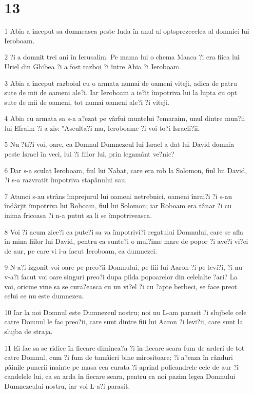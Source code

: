 \chapter{13}

\par 1 Abia a început sa domneasca peste Iuda în anul al optsprezecelea al domniei lui Ieroboam.
\par 2 ?i a domnit trei ani în Ierusalim. Pe mama lui o chema Maaca ?i era fiica lui Uriel din Ghibea ?i a fost razboi ?i între Abia ?i Ieroboam.
\par 3 Abia a început razboiul cu o armata numai de oameni viteji, adica de patru sute de mii de oameni ale?i. Iar Ieroboam a ie?it împotriva lui la lupta cu opt sute de mii de oameni, tot numai oameni ale?i ?i viteji.
\par 4 Abia cu armata sa s-a a?ezat pe vârfui muntelui ?emaraim, unul dintre mun?ii lui Efraim ?i a zis: "Asculta?i-ma, Ieroboame ?i voi to?i Israeli?ii.
\par 5 Nu ?ti?i voi, oare, ca Domnul Dumnezeul lui Israel a dat lui David domnia peste Israel în veci, lui ?i fiilor lui, prin legamânt ve?nic?
\par 6 Dar s-a sculat Ieroboam, fiul lui Nabat, care era rob la Solomon, fiul lui David, ?i s-a razvratit împotriva stapânului sau.
\par 7 Atunci s-au strâns împrejurul lui oameni netrebnici, oameni înrai?i ?i s-au îndârjit împotriva lui Roboam, fiul lui Solomon; iar Roboam era tânar ?i cu inima fricoasa ?i n-a putut sa li se împotriveasca.
\par 8 Voi ?i acum zice?i ca pute?i sa va împotrivi?i regatului Domnului, care se afla în mina fiilor lui David, pentru ca sunte?i o mul?ime mare de popor ?i ave?i vi?ei de aur, pe care vi i-a facut Ieroboam, ca dumnezei.
\par 9 N-a?i izgonit voi oare pe preo?ii Domnului, pe fiii lui Aaron ?i pe levi?i, ?i nu v-a?i facut voi oare singuri preo?i dupa pilda popoarelor din celelalte ?ari? La voi, oricine vine sa se cura?easca cu un vi?el ?i cu ?apte berbeci, se face preot celui ce nu este dumnezeu.
\par 10 Iar la noi Domnul este Dumnezeul nostru; noi nu L-am parasit ?i slujbele cele catre Domnul le fac preo?ii, care sunt dintre fiii lui Aaron ?i levi?ii, care sunt la slujba de straja.
\par 11 Ei fac sa se ridice în fiecare diminea?a ?i în fiecare seara fum de arderi de tot catre Domnul, cum ?i fum de tamâieri bine mirositoare; ?i a?eaza în rânduri pâinile punerii înainte pe masa cea curata ?i aprind policandrele cele de aur ?i candelele lui, ca sa arda în fiecare seara, pentru ca noi pazim legea Domnului Dumnezeului nostru, iar voi L-a?i parasit.
